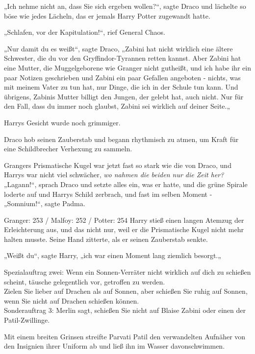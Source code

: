 {„Ich nehme nicht an, dass Sie sich ergeben wollen?“, sagte Draco und lächelte so böse wie jedes Lächeln, das er jemals Harry Potter zugewandt hatte.

„Schlafen, vor der Kapitulation!“, rief General Chaos.

„Nur damit du es weißt“, sagte Draco, „Zabini hat nicht wirklich eine ältere Schwester, die du vor den Gryffindor-Tyrannen retten kannst. Aber Zabini hat eine Mutter, die Muggelgeborene wie Granger nicht gutheißt, und ich habe ihr ein paar Notizen geschrieben und Zabini ein paar Gefallen angeboten - nichts, was mit meinem Vater zu tun hat, nur Dinge, die ich in der Schule tun kann. Und übrigens, Zabinis Mutter billigt den Jungen, der gelebt hat, auch nicht. Nur für den Fall, dass du immer noch glaubst, Zabini sei wirklich auf deiner Seite.„

Harrys Gesicht wurde noch grimmiger.

Draco hob seinen Zauberstab und begann rhythmisch zu atmen, um Kraft für eine Schildbrecher Verhexung zu sammeln.

Grangers Prismatische Kugel war jetzt fast so stark wie die von Draco, und Harrys war nicht viel schwächer, \emph{wo nahmen die beiden nur die Zeit her?}\\ „Lagann!“, sprach Draco und setzte alles ein, was er hatte, und die grüne Spirale loderte auf und Harrys Schild zerbrach, und fast im selben Moment -\\ „Somnium!“, sagte Padma.

Granger: 253 / Malfoy: 252 / Potter: 254 Harry stieß einen langen Atemzug der Erleichterung aus, und das nicht nur, weil er die Prismatische Kugel nicht mehr halten musste. Seine Hand zitterte, als er seinen Zauberstab senkte.

„Weißt du“, sagte Harry, „ich war einen Moment lang ziemlich besorgt.„

Spezialauftrag zwei: Wenn ein Sonnen-Verräter nicht wirklich auf dich zu schießen scheint, täusche gelegentlich vor, getroffen zu werden.\\ Zielen Sie lieber auf Drachen als auf Sonnen, aber schießen Sie ruhig auf Sonnen, wenn Sie nicht auf Drachen schießen können.\\ Sonderauftrag 3: Merlin sagt, schießen Sie nicht auf Blaise Zabini oder einen der Patil-Zwillinge.

Mit einem breiten Grinsen streifte Parvati Patil den verwandelten Aufnäher von den Insignien ihrer Uniform ab und ließ ihn im Wasser davonschwimmen.

}
